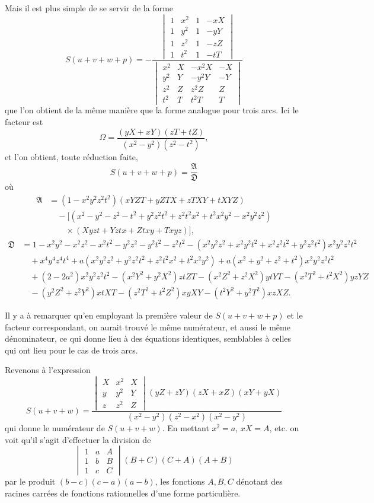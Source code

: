 \documentclass[12pt,a4paper]{article}
\theoremstyle{definition}
\begin{document}
Mais il est plus simple de se servir de la forme
\[
S(u + v + w + p) = -\frac{
\begin{vmatrix}
1 & x^2 & 1 & -xX \\
1 & y^2 & 1 & -yY \\
1 & z^2 & 1 & -zZ \\
1 & t^2 & 1 & -tT
\end{vmatrix}}{
\begin{vmatrix}
x^2 & X & -x^2X & -X \\
y^2 & Y & -y^2Y & -Y \\
z^2 & Z & z^2Z & Z \\
t^2 & T & t^2T & T
\end{vmatrix}}
\]
que l'on obtient de la m\^{e}me mani\`{e}re que la forme analogue pour trois arcs. Ici le facteur est
\[
\Omega = \frac{(yX + xY)(zT + tZ)}{(x^2 - y^2)(z^2 - t^2)},
\]
et l'on obtient, toute r\'{e}duction faite,
\[
S(u + v + w + p) = \frac{\mathfrak{A}}{\mathfrak{D}}
\]
o\`{u}
\begin{align*}
\mathfrak{A} &= (1 - x^2y^2z^2t^2)(xYZT + yZTX + zTXY + tXYZ) \\
&\quad - [(x^2 - y^2 - z^2 - t^2 + y^2z^2t^2 + z^2t^2x^2 + t^2x^2y^2 - x^2y^2z^2) \\
&\qquad \times (Xyzt + Yztx + Ztxy + Txyz)],
\end{align*}
\begin{align*}
\mathfrak{D} &= 1 - x^2y^2 - x^2z^2 - x^2t^2 - y^2z^2 - y^2t^2 - z^2t^2 - (x^2y^2z^2 + x^2y^2t^2 + x^2z^2t^2 + y^2z^2t^2)x^2y^2z^2t^2 \\
&\quad + x^4y^4z^4t^4 + a(x^2y^2z^2 + y^2z^2t^2 + z^2t^2x^2 + t^2x^2y^2) + a(x^2 + y^2 + z^2 + t^2)x^2y^2z^2t^2 \\
&\quad + (2 - 2a^2)x^2y^2z^2t^2 - (x^2Y^2 + y^2X^2)ztZT - (x^2Z^2 + z^2X^2)ytYT - (x^2T^2 + t^2X^2)yzYZ \\
&\quad - (y^2Z^2 + z^2Y^2)xtXT - (z^2T^2 + t^2Z^2)xyXY - (t^2Y^2 + y^2T^2)xzXZ.
\end{align*}

Il y a \`{a} remarquer qu'en employant la premi\`{e}re valeur de $S(u + v + w + p)$ et le facteur correspondant, on aurait trouv\'{e} le m\^{e}me num\'{e}rateur, et aussi le m\^{e}me d\'{e}nominateur, ce qui donne lieu \`{a} des \'{e}quations identiques, semblables \`{a} celles qui ont lieu pour le cas de trois arcs.

Revenons \`{a} l'expression
\[
S(u + v + w) = \frac{
\begin{vmatrix}
X & x^2 & X \\
y & y^2 & Y \\
z & z^2 & Z
\end{vmatrix}
(yZ + zY)(zX + xZ)(xY + yX)}{(x^2 - y^2)(z^2 - x^2)(x^2 - y^2)}
\]
qui donne le num\'{e}rateur de $S(u + v + w)$. En mettant $x^2 = a$, $xX = A$, etc. on voit qu'il s'agit d'effectuer la division de
\[
\begin{vmatrix}
1 & a & A \\
1 & b & B \\
1 & c & C
\end{vmatrix}(B + C)(C + A)(A + B)
\]
par le produit $(b - c)(c - a)(a - b)$, les fonctions $A, B, C$ d\'{e}notant des racines carr\'{e}es de fonctions rationnelles d'une forme particuli\`{e}re.
\end{document}
